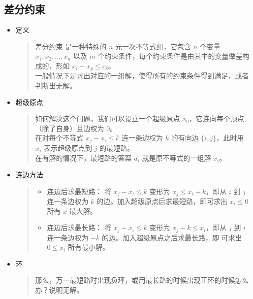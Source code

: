 \documentclass[a4paper,12pt]{article}
\begin{document}
\subsection{差分约束}

\begin{itemize}
    \item 定义
    \begin{quote}
        差分约束 是一种特殊的 \(n\) 元一次不等式组，它包含 \(n\) 个变量
        \(x_1,x_2,...,x_n\) 以及 \(m\)
        个约束条件，每个约束条件是由其中的变量做差构成的，形如
        \(x_i - x_y \leq c_k\)。\\
        
        一般情况下是求出对应的一组解，使得所有的约束条件得到满足，或者判断出无解。        
    \end{quote}

    \item 超级原点
    \begin{quote}
        如何解决这个问题，我们可以设立一个超级原点
        \(x_0\)，它连向每个顶点（除了自身）且边权为 \(0\)。\\
        
        在对每个不等式 \(x_j - x_i \leq k\) 连一条边权为 \(k\) 的有向边
        \(\{i,j\}\)，此时用 \(x_j\) 表示超级原点到 \(j\) 的最短路。\\
        
        在有解的情况下，最短路的答案 \(d_i\) 就是原不等式的一组解 \(x_i\)。        
    \end{quote}

    \item 连边方法
    \begin{quote}
        \begin{itemize}
        \def\labelenumi{\arabic{enumi}.}
        \item
            连边后求最短路：
            将 \(x_j - x_i \leq k\) 变形为 \(x_j \leq x_i + k\)，即从 \(i\) 到
            \(j\) 连一条边权为 \(k\) 的边。加入超级原点后求最短路，即可求出
            \(x_i \leq 0\) 所有 \(x\) 最大解。
        \item
            连边后求最长路：
            将 \(x_j - x_i \leq k\) 变形为 \(x_j - k \leq x_i\)，即从 \(j\) 到 \(i\)
            连一条边权为 \(-k\) 的边。加入超级原点之后求最长路，即 可求出
            \(0 \leq x_i\) 所有最小解。   
        \end{itemize}     
    \end{quote}

    \item 环
    \begin{quote}
        那么，万一最短路时出现负环，或用最长路的时候出现正环的时候怎么办？说明无解。                
    \end{quote}


\end{itemize}
\end{document}
